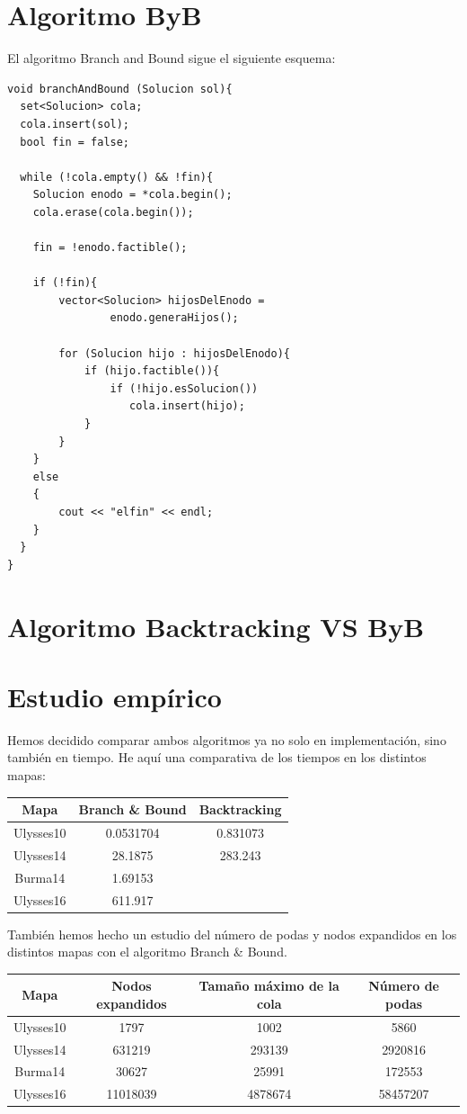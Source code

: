 \documentclass{article}
\begin{document}
	\section{Algoritmo ByB}
	El algoritmo Branch and Bound sigue el siguiente esquema:
	
	\begin{lstlisting}
void branchAndBound (Solucion sol){
  set<Solucion> cola;
  cola.insert(sol);
  bool fin = false;

  while (!cola.empty() && !fin){
	Solucion enodo = *cola.begin();
	cola.erase(cola.begin());

	fin = !enodo.factible();

	if (!fin){
		vector<Solucion> hijosDelEnodo = 
				enodo.generaHijos();

		for (Solucion hijo : hijosDelEnodo){
			if (hijo.factible()){
				if (!hijo.esSolucion())
				   cola.insert(hijo);
			}
		}
	}
	else
	{
		cout << "elfin" << endl;
	}
  }
}
	\end{lstlisting}
	
	\section{Algoritmo Backtracking VS ByB}
	\section{Estudio empírico}
	Hemos decidido comparar ambos algoritmos ya no solo en implementación, sino también en tiempo. He aquí una comparativa de los tiempos en los distintos mapas:
	
	\begin{longtable}{|c|c|c|}
		\hline
		Mapa & Branch \& Bound & Backtracking \\ \hline
		Ulysses10 & 0.0531704 & 0.831073  \\ \hline
		Ulysses14 & 28.1875 & 283.243 \\ \hline
		Burma14 & 1.69153 & \\ \hline
		Ulysses16 & 611.917 & \\ \hline
	\end{longtable}

	También hemos hecho un estudio del número de podas y nodos expandidos en los distintos mapas con el algoritmo Branch \& Bound.
	
	\begin{longtable}{|c|c|c|c|}
		\hline
		Mapa & Nodos expandidos & Tamaño máximo de la cola & Número de podas \\ \hline
		Ulysses10 & 1797 & 1002 & 5860  \\ \hline
		Ulysses14 & 631219 & 293139 & 2920816 \\ \hline
		Burma14 & 30627 & 25991 & 172553 \\ \hline
		Ulysses16 & 11018039 & 4878674 & 58457207 \\ \hline
	\end{longtable}
\end{document}
